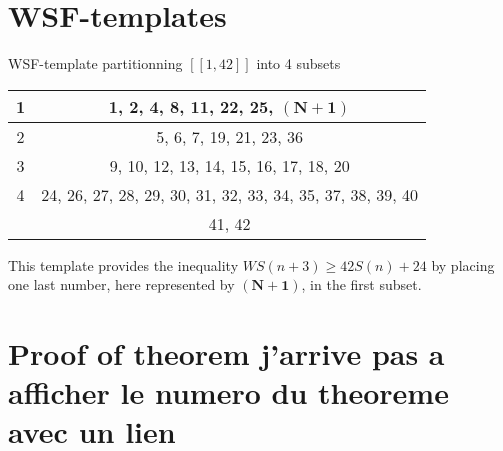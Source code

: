 \begin{center}
\begin{tabular}{|*{2}{c|}}
\end{tabular}
\end{center}


\section{WSF-templates}

\begin{center}
WSF-template partitionning \([\![1, 42]\!]\) into 4 subsets
\begin{tabular}{|*{2}{c|}}
	\hline
	1 & 1, 2, 4, 8, 11, 22, 25, \(\mathbf{(N+1)}\)\\
	\hline
	2 & 5, 6, 7, 19, 21, 23, 36\\
	\hline
	3 & 9, 10, 12, 13, 14, 15, 16, 17, 18, 20\\
	\hline
	4 & 24, 26, 27, 28, 29, 30, 31, 32, 33, 34, 35, 37, 38, 39, 40\\
	& 41, 42\\
	\hline
\end{tabular}
\end{center}

This template provides the inequality \(WS(n+3) \geqslant 42S(n) + 24\)
by placing one last number, here represented by \(\mathbf{(N+1)}\), in the first subset.


\section{Proof of theorem j'arrive pas a afficher le numero du theoreme avec un lien}

